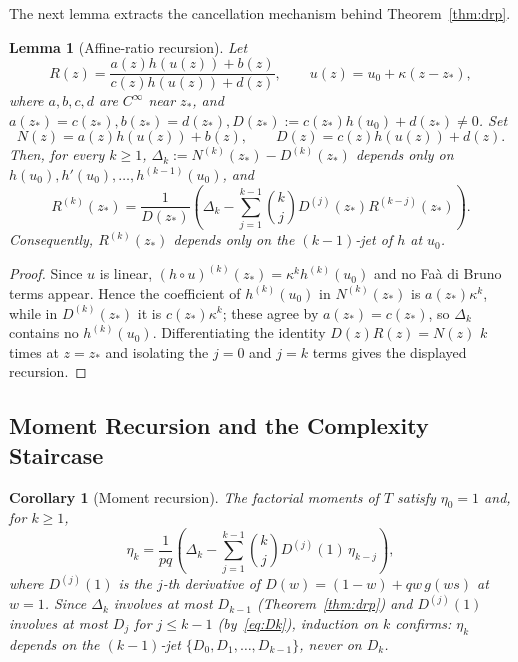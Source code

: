 \documentclass[11pt]{article}
\theoremstyle{plain}
\newtheorem{lemma}[theorem]{Lemma}
\newtheorem{corollary}[theorem]{Corollary}
\theoremstyle{definition}
\theoremstyle{remark}
\begin{document}
The next lemma extracts the cancellation mechanism behind Theorem~\ref{thm:drp}.



\begin{lemma}[Affine-ratio recursion]\label{lem:affine-ratio-rec}
Let
\[
  R(z)=\frac{a(z)h(u(z))+b(z)}{c(z)h(u(z))+d(z)},
  \qquad
  u(z)=u_0+\kappa(z-z_*),
\]
where $a,b,c,d$ are $C^\infty$ near $z_*$, and $a(z_*)=c(z_*), b(z_*)=d(z_*), D(z_*):=c(z_*)h(u_0)+d(z_*)\neq 0$.
Set
\[
  N(z)=a(z)h(u(z))+b(z),\qquad D(z)=c(z)h(u(z))+d(z).
\]
Then, for every $k\ge 1$, $\Delta_k:=N^{(k)}(z_*)-D^{(k)}(z_*)$ depends only on $h(u_0),h'(u_0),\dots,h^{(k-1)}(u_0)$, and
\[
  R^{(k)}(z_*)
  =
  \frac{1}{D(z_*)}
  \left(
    \Delta_k-\sum_{j=1}^{k-1}\binom{k}{j}D^{(j)}(z_*)R^{(k-j)}(z_*)
  \right).
\]
Consequently, $R^{(k)}(z_*)$ depends only on the $(k-1)$-jet of $h$ at $u_0$.
\end{lemma}

\begin{proof}
Since $u$ is linear, $(h\circ u)^{(k)}(z_*)=\kappa^k h^{(k)}(u_0)$ and no Fa\`a di Bruno terms appear. Hence the coefficient of $h^{(k)}(u_0)$ in $N^{(k)}(z_*)$ is $a(z_*)\kappa^k$, while in $D^{(k)}(z_*)$ it is $c(z_*)\kappa^k$; these agree by $a(z_*)=c(z_*)$, so $\Delta_k$ contains no $h^{(k)}(u_0)$. Differentiating the identity $D(z)R(z)=N(z)$ $k$ times at $z=z_*$ and isolating the $j=0$ and $j=k$ terms gives the displayed recursion.
\end{proof}


\subsection{Moment Recursion and the Complexity Staircase}\label{sec:staircase}

\begin{corollary}[Moment recursion]\label{cor:moment-recursion}
The factorial moments of $T$ satisfy $\eta_0 = 1$ and, for $k \geq 1$,
\begin{equation}\label{eq:recursion}
  \eta_k = \frac{1}{pq}\left(\Delta_k - \sum_{j=1}^{k-1} \binom{k}{j} D^{(j)}(1)\,\eta_{k-j}\right),
\end{equation}
where $D^{(j)}(1)$ is the $j$-th derivative of $D(w) = (1-w) + qw\,g(ws)$ at $w = 1$.  Since $\Delta_k$ involves at most $D_{k-1}$ (Theorem~\ref{thm:drp}) and $D^{(j)}(1)$ involves at most $D_j$ for $j \leq k-1$ (by~\eqref{eq:Dk}), induction on $k$ confirms: $\eta_k$ depends on the $(k{-}1)$-jet $\{D_0, D_1, \ldots, D_{k-1}\}$, never on $D_k$.
\end{corollary}
\end{document}
